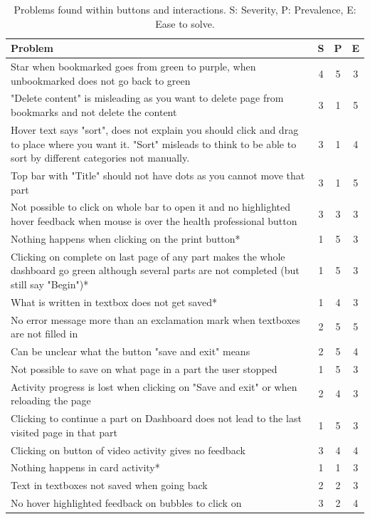 \documentclass{sigchi}
\begin{document}
\begin{table}[H]
    \centering
    \begin{tabular}{|m{6.5cm}|c|c|c|}
    \hline
        \textbf{Problem} & \textbf{S} & \textbf{P} & \textbf{E}\\
    \hline
         Star when bookmarked goes from green to purple, when unbookmarked does not go back to green  & 4 & 5 & 3\\
    \hline
         "Delete content" is misleading as you want to delete page from bookmarks and not delete the content & 3 & 1 & 5\\
    \hline
         Hover text says "sort", does not explain you should click and drag to place where you want it. "Sort" misleads to think to be able to sort by different categories not manually. & 3 & 1 & 4\\
    \hline
         Top bar with "Title" should not have dots as you cannot move that part & 3 & 1 & 5\\
    \hline
         Not possible to click on whole bar to open it and no highlighted hover feedback when mouse is over the health professional button & 3 & 3 & 3\\
    \hline
         Nothing happens when clicking on the print button* & 1 & 5 & 3\\
    \hline
         Clicking on complete on last page of any part makes the whole dashboard go green although several parts are not completed (but still say "Begin")* & 1 & 5 & 3\\
    \hline
         What is written in textbox does not get saved* & 1 & 4 & 3\\
    \hline
         No error message more than an exclamation mark when textboxes are not filled in & 2 & 5 & 5\\
    \hline
         Can be unclear what the button "save and exit" means & 2 & 5 & 4\\
    \hline
         Not possible to save on what page in a part the user stopped & 1 & 5 & 3\\
    \hline
         Activity progress is lost when clicking on "Save and exit" or when reloading the page & 2 & 4 & 3\\
    \hline
         Clicking to continue a part on Dashboard does not lead to the last visited page in that part & 1 & 5 & 3\\
    \hline
         Clicking on button of video activity gives no feedback & 3 & 4 & 4\\
    \hline
         Nothing happens in card activity* & 1 & 1 & 3\\
    \hline
         Text in textboxes not saved when going back & 2 & 2 & 3\\
    \hline
         No hover highlighted feedback on bubbles to click on & 3 & 2 & 4\\
    \hline
    \end{tabular}
    \caption{Problems found within buttons and interactions. S: Severity, P: Prevalence, E: Ease to solve.}
    \label{tab:interactions}
\end{table}
\end{document}
